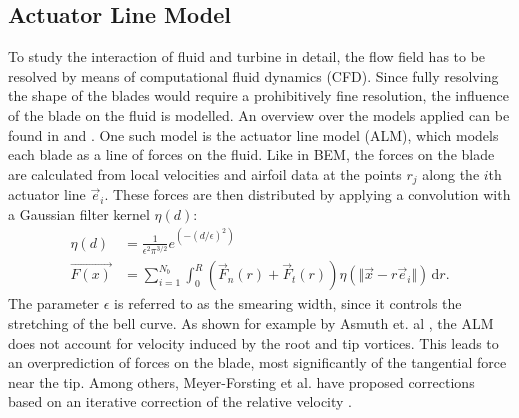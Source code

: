 \subsection{Actuator Line Model}
To study the interaction of fluid and turbine in detail, the flow field has to be resolved by means of computational fluid dynamics (CFD). Since fully resolving the shape of the blades would require a prohibitively fine resolution, the influence of the blade on the fluid is modelled. An overview over the models applied can be found in \cite{breton_survey_2017} and \cite{kheirabadi_quantitative_2019}. One such model is the actuator line model (ALM), which models each blade as a line of forces on the fluid. Like in BEM, the forces on the blade are calculated from local velocities and airfoil data at the points $r_j$ along the $i$th actuator line $\vec{e}_i$. These forces are then distributed by applying a convolution with a Gaussian filter kernel $\eta(d)$:
\begin{align}
	\eta(d) &= \frac{1}{\epsilon^2 \pi^{3/2}} e^{(-(d/\epsilon)^2)} \label{eq:gauss_alm} \\
	\vec{F(x)} &= \sum_{i=1}^{N_b} \int_{0}^{R} \left(\vec{F}_n(r)+ \vec{F}_t(r) \right) \eta(\Vert \vec{x} - r\vec{e}_i\Vert)\, \mathrm{d}r. \label{eq:ALM}
\end{align} The parameter $\epsilon$ is referred to as the smearing width, since it controls the stretching of the bell curve. As shown for example by Asmuth et. al \cite{asmuth_actuator_2019}, the ALM does not account for velocity induced by the root and tip vortices. This leads to an overprediction of forces on the blade, most significantly of the tangential force near the tip. Among others, Meyer-Forsting et al. have proposed corrections  based on an iterative correction of the relative velocity \cite{meyer_forsting_vortex-based_2019}. \cite{sorensen_numerical_2002}

